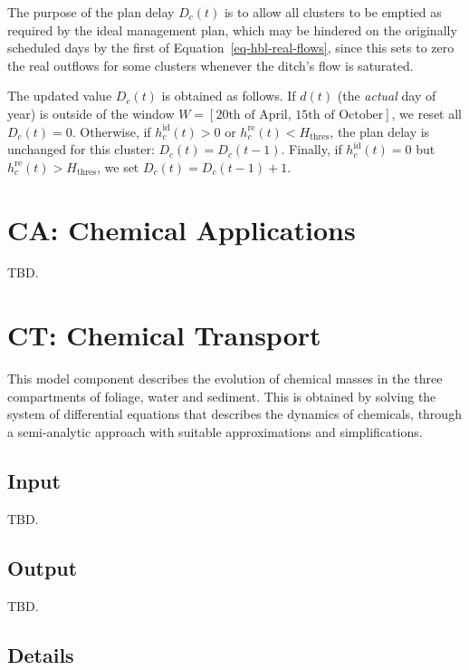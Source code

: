 \documentclass[
  letterpaper,
  DIV=11,
  numbers=noendperiod]{scrreprt}
\begin{document}
The purpose of the plan delay \(D_c(t)\) is to allow all clusters to be
emptied as required by the ideal management plan, which may be hindered
on the originally scheduled days by the first of
Equation~\ref{eq-hbl-real-flows}, since this sets to zero the real
outflows for some clusters whenever the ditch's flow is saturated.

The updated value \(D_c(t)\) is obtained as follows. If \(d(t)\) (the
\emph{actual} day of year) is outside of the window
\(W = [\text{20th of April},\,\text{15th of October}]\), we reset all
\(D_c(t) = 0\). Otherwise, if \(h_c ^{\text{id}}(t)>0\) or
\(h_c ^{\text{re}}(t)<H_{\text{thres}}\), the plan delay is unchanged
for this cluster: \(D_c(t) = D_c(t-1)\). Finally, if
\(h_c ^{\text{id}}(t)=0\) but \(h_c ^{\text{re}}(t)>H_{\text{thres}}\),
we set \(D_c(t) = D_c(t-1) + 1\).

\section{CA: Chemical Applications}\label{ca-chemical-applications}

TBD.

\section{CT: Chemical Transport}\label{ct-chemical-transport}

This model component describes the evolution of chemical masses in the
three compartments of foliage, water and sediment. This is obtained by
solving the system of differential equations that describes the dynamics
of chemicals, through a semi-analytic approach with suitable
approximations and simplifications.

\subsection{Input}\label{input-3}

TBD.

\subsection{Output}\label{output-3}

TBD.

\subsection{Details}\label{details-1}
\end{document}
